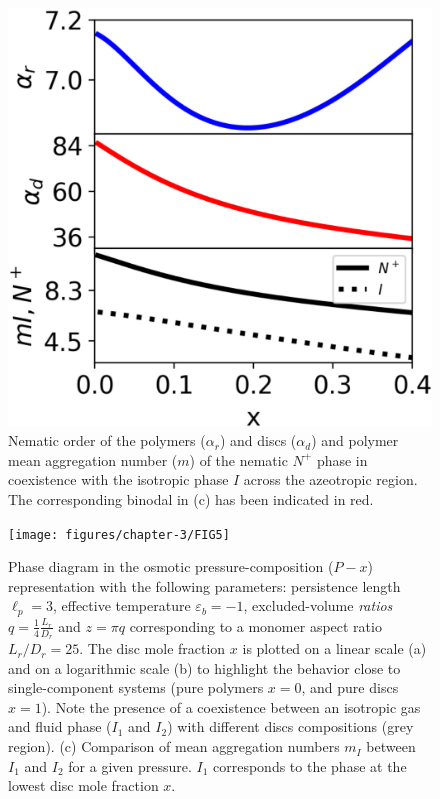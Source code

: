 \begin{figure}
  \includegraphics[width= .8\linewidth]{figures/chapter-3/FIG4}
\caption{Nematic order of the polymers ($\alpha_{r}$) and discs ($\alpha_{d}$) and polymer mean aggregation number ($m$) of  the nematic $N^{+}$ phase in coexistence with the isotropic phase $I$  across the azeotropic region. The corresponding binodal in (c) has been indicated in red. } 
  \label{fig:azeotrope}
\end{figure}

\begin{figure}[ht]
  \texttt{[image: figures/chapter-3/FIG5]}
\caption{Phase diagram in the osmotic pressure-composition ($P-x$) representation with the following parameters: persistence length $\ell_{p} = 3$, effective temperature $\varepsilon_{b} = -1$, excluded-volume {\em ratios} $q = \frac{1}{4}\frac{L_{r}}{D_{r}}$ and $z=\pi q$ corresponding to a monomer aspect ratio $L_{r}/D_{r} =25$. The disc mole fraction $x$ is plotted on a linear scale (a) and on a logarithmic scale (b) to highlight the behavior close to single-component systems (pure polymers $x=0$, and pure discs $x=1$). Note the presence of a coexistence between an isotropic gas and fluid  phase ($I_1$ and $I_2$) with different discs compositions (grey region). (c) Comparison of mean aggregation numbers $m_{I}$ between $I_{1}$ and $I_{2}$ for a given pressure. $I_{1}$ corresponds to the phase at the lowest disc mole fraction $x$. }
  \label{fig:coexistence}
\end{figure}

